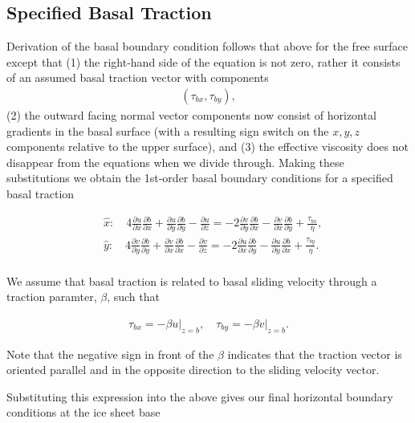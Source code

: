 \subsection{Specified Basal Traction}
Derivation of the basal boundary condition follows that above for the free surface except that (1) the right-hand side of the equation is not zero, rather it consists of an assumed basal traction vector with components 
\begin{align*}
\left( \tau _{bx},\tau _{by} \right),
\end{align*}
(2) the outward facing normal vector components now consist of horizontal gradients in the basal surface (with a resulting sign switch on the $x,y,z$ components relative to the upper surface), and (3) the effective viscosity does not disappear from the equations when we divide through. Making these substitutions we obtain the 1st-order basal boundary conditions for a specified basal traction

\begin{align*}
  & \hat{x}:\quad 4\frac{\partial u}{\partial x}\frac{\partial b}{\partial x}+\frac{\partial u}{\partial y}\frac{\partial b}{\partial y}-\frac{\partial u}{\partial z}=-2\frac{\partial v}{\partial y}\frac{\partial b}{\partial x}-\frac{\partial v}{\partial x}\frac{\partial b}{\partial y}+\frac{\tau _{bx}}{\eta }, \\ 
 & \hat{y}:\quad 4\frac{\partial v}{\partial y}\frac{\partial b}{\partial y}+\frac{\partial v}{\partial x}\frac{\partial b}{\partial x}-\frac{\partial v}{\partial z}=-2\frac{\partial u}{\partial x}\frac{\partial b}{\partial y}-\frac{\partial u}{\partial y}\frac{\partial b}{\partial x}+\frac{\tau _{by}}{\eta }. \\
 \end{align*}

We assume that basal traction is related to basal sliding velocity through a traction paramter, $\beta$, such that

\begin{align*}
\tau _{bx}=\left. -\beta u \right|_{z=b},\quad \tau _{by}=\left. -\beta v \right|_{z=b}.
\end{align*}

Note that the negative sign in front of the $\beta$ indicates that the traction vector is oriented parallel and in the opposite direction to the sliding velocity vector.

Substituting this expression into the above gives our final horizontal boundary conditions at the ice sheet base

